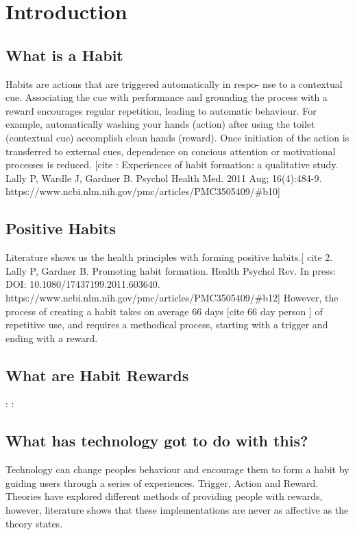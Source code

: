 
\section{Introduction}

\subsection*{What is a Habit}

Habits are actions that are triggered automatically in respo- nse to a contextual cue. Associating the cue with performance and grounding the process with a reward encourages regular repetition, leading to automatic behaviour. For example, automatically washing your hands (action) after using the toilet (contextual cue) accomplish clean hands (reward). Once initiation of the action is transferred to external cues, dependence on concious attention or motivational processes is reduced. [cite : Experiences of habit formation: a qualitative study. Lally P, Wardle J, Gardner B. Psychol Health Med. 2011 Aug; 16(4):484-9. https://www.ncbi.nlm.nih.gov/pmc/articles/PMC3505409/#b10]

\subsection*{Positive Habits}

Literature shows us the health principles with forming positive habits.[ cite 2. Lally P, Gardner B. Promoting habit formation. Health Psychol Rev. In press: DOI: 10.1080/17437199.2011.603640. https://www.ncbi.nlm.nih.gov/pmc/articles/PMC3505409/#b12] However, the process of creating a habit takes on average 66 days [cite 66 day person ] of repetitive use, and requires a methodical process, starting with a trigger and ending with a reward.

\subsection*{What are Habit Rewards}

:\newline
:

\subsection*{What has technology got to do with this?}

Technology can change peoples behaviour and encourage them to form a habit by guiding users through a series of experiences. Trigger, Action and Reward. Theories have explored different methods of providing people with rewards, however, literature shows that these implementations are never as affective as the theory states.

